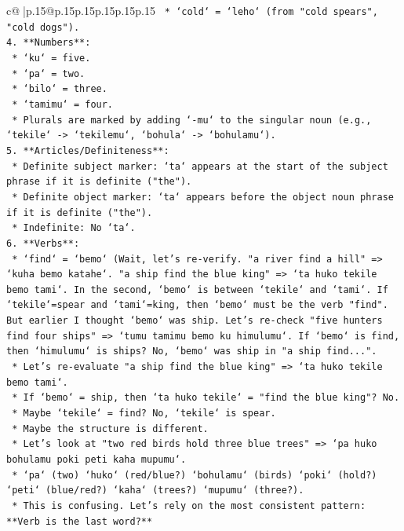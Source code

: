\documentclass{article}
\begin{document}
{\begin{supertabular}{c@{$\;$}|p{.15\linewidth}@{}p{.15\linewidth}p{.15\linewidth}p{.15\linewidth}p{.15\linewidth}p{.15\linewidth}}
{{{\texttt{    *   `cold` = `leho` (from "cold spears", "cold dogs").} \\
\texttt{4.  **Numbers**:} \\
\texttt{    *   `ku` = five.} \\
\texttt{    *   `pa` = two.} \\
\texttt{    *   `bilo` = three.} \\
\texttt{    *   `tamimu` = four.} \\
\texttt{    *   Plurals are marked by adding `{-}mu` to the singular noun (e.g., `tekile` {-}> `tekilemu`, `bohula` {-}> `bohulamu`).} \\
\texttt{5.  **Articles/Definiteness**:} \\
\texttt{    *   Definite subject marker: `ta` appears at the start of the subject phrase if it is definite ("the").} \\
\texttt{    *   Definite object marker: `ta` appears before the object noun phrase if it is definite ("the").} \\
\texttt{    *   Indefinite: No `ta`.} \\
\texttt{6.  **Verbs**:} \\
\texttt{    *   `find` = `bemo` (Wait, let's re{-}verify. "a river find a hill" => `kuha bemo katahe`. "a ship find the blue king" => `ta huko tekile bemo tami`. In the second, `bemo` is between `tekile` and `tami`. If `tekile`=spear and `tami`=king, then `bemo` must be the verb "find". But earlier I thought `bemo` was ship. Let's re{-}check "five hunters find four ships" => `tumu tamimu bemo ku himulumu`. If `bemo` is find, then `himulumu` is ships? No, `bemo` was ship in "a ship find...".} \\
\texttt{    *   Let's re{-}evaluate "a ship find the blue king" => `ta huko tekile bemo tami`.} \\
\texttt{        *   If `bemo` = ship, then `ta huko tekile` = "find the blue king"? No.} \\
\texttt{        *   Maybe `tekile` = find? No, `tekile` is spear.} \\
\texttt{        *   Maybe the structure is different.} \\
\texttt{        *   Let's look at "two red birds hold three blue trees" => `pa huko bohulamu poki peti kaha mupumu`.} \\
\texttt{            *   `pa` (two) `huko` (red/blue?) `bohulamu` (birds) `poki` (hold?) `peti` (blue/red?) `kaha` (trees?) `mupumu` (three?).} \\
\texttt{            *   This is confusing. Let's rely on the most consistent pattern: **Verb is the last word?**} \\
}}}
\end{supertabular}}
\end{document}
